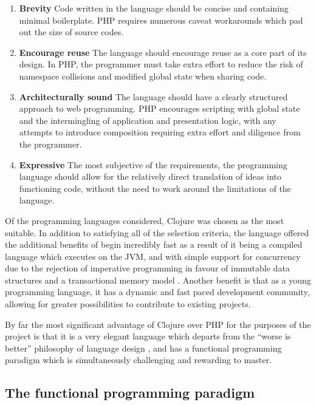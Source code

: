 \begin{enumerate}
\item \textbf{Brevity} Code written in the language should be concise
  and containing minimal boilerplate. PHP requires numerous caveat
  workarounds which pad out the size of source codes.
\item \textbf{Encourage reuse} The language should encourage reuse as
  a core part of its design. In PHP, the programmer must take extra
  effort to reduce the risk of namespace collisions and modified
  global state when sharing code.
\item \textbf{Architecturally sound} The language should have a
  clearly structured approach to web programming. PHP encourages
  scripting with global state and the intermingling of application and
  presentation logic, with any attempts to introduce composition
  requiring extra effort and diligence from the programmer.
\item \textbf{Expressive} The most subjective of the requirements, the
  programming language should allow for the relatively direct
  translation of ideas into functioning code, without the need to work
  around the limitations of the language.
\end{enumerate}

Of the programming languages considered, Clojure was chosen as the
most suitable. In addition to satisfying all of the selection
criteria, the language offered the additional benefits of begin
incredibly fast as a result of it being a compiled language which
executes on the JVM, and with simple support for concurrency due to
the rejection of imperative programming in favour of immutable data
structures and a transactional memory model
\cite{halloway2009programming, kraus2009multi}. Another benefit is
that as a young programming language, it has a dynamic and fast paced
development community, allowing for greater possibilities to
contribute to existing projects.

By far the most significant advantage of Clojure over PHP for the
purposes of the project is that it is a very elegant language which
departs from the ``worse is better'' philosophy of language design
\cite{gabriel1991rise}, and has a functional programming paradigm
which is simultaneously challenging and rewarding to master.

\subsection{The functional programming paradigm}\label{subsec:functional-programming-paradigm}

